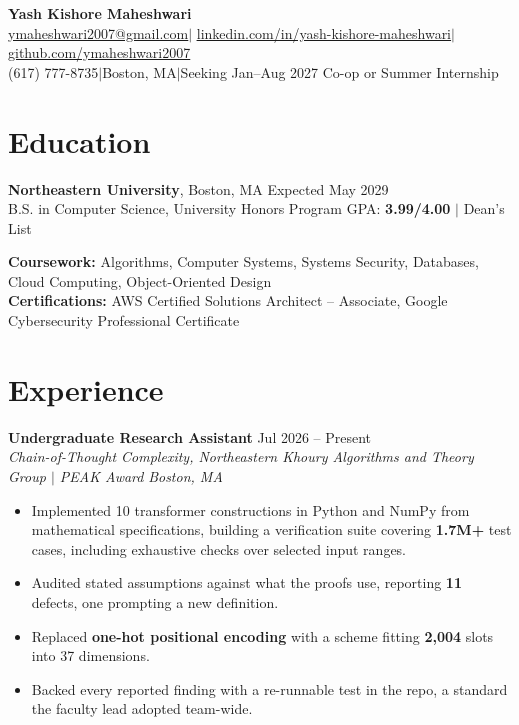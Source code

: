 \documentclass[letterpaper,10pt]{article}
\let\hrefplain\href
\renewcommand{\href}[2]{\hrefplain{#1}{\uline{#2}}}
\newcommand{\entrysize}{\fontsize{10.5}{12}\selectfont}
\newif\ifentrygap
\newcommand{\entrygapsize}{6pt}
\newcommand{\entryfirstgap}{0.4pt}
\newcommand{\entrysep}{\ifentrygap\vspace{\entrygapsize}\else\vspace{\entryfirstgap}\fi\global\entrygaptrue}
\let\entryorigsection\section
\renewcommand{\section}{\global\entrygapfalse\entryorigsection}
\newcommand{\entry}[4]{\entrysep{\entrysize\textbf{#1}} \hfill #2 \\ \textit{#3} \hfill \textit{#4}}
\newcommand{\hsep}{\hspace{0.2222em minus 0.1em}$\vert$\hspace{0.2222em minus 0.1em}}
\begin{document}
\begin{center}
  {\fontsize{18}{20}\selectfont\bfseries Yash Kishore Maheshwari}\\[3pt]
  \href{mailto:ymaheshwari2007@gmail.com}{ymaheshwari2007@gmail.com}\hsep%
  \href{https://linkedin.com/in/yash-kishore-maheshwari}{linkedin.com/in/yash-kishore-maheshwari}\hsep%
  \href{https://github.com/ymaheshwari2007}{github.com/ymaheshwari2007}\\
  (617) 777-8735\hsep Boston, MA\hsep Seeking Jan--Aug 2027 Co-op or Summer Internship
\end{center}

\section{Education}

\textbf{Northeastern University}, Boston, MA \hfill Expected May 2029 \\
B.S. in Computer Science, University Honors Program \hfill
GPA: \textbf{3.99/4.00} $\vert$ Dean's List

\vspace{1pt}
\textbf{Coursework:} Algorithms, Computer Systems, Systems Security, Databases, Cloud Computing, Object-Oriented Design \\
\textbf{Certifications:} AWS Certified Solutions Architect -- Associate, Google Cybersecurity Professional Certificate

\section{Experience}

\entry{Undergraduate Research Assistant}{Jul 2026 -- Present}
      {Chain-of-Thought Complexity, Northeastern Khoury Algorithms and Theory Group $\vert$ PEAK Award}{Boston, MA}
\begin{itemize}
  \item Implemented 10 transformer constructions in Python and NumPy from mathematical specifications, building a
        verification suite covering \textbf{1.7M+} test cases, including exhaustive checks over selected input ranges.
  \item Audited stated assumptions against what the proofs use, reporting \textbf{11} defects, one prompting a new definition.
  \item Replaced \textbf{one-hot positional encoding} with a scheme fitting \textbf{2,004} slots into 37 dimensions.
  \item Backed every reported finding with a re-runnable test in the repo, a standard the faculty lead adopted team-wide.
\end{itemize}
\end{document}
